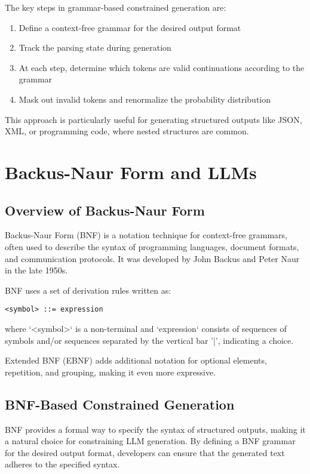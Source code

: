 \documentclass{article}
\begin{document}
The key steps in grammar-based constrained generation are:
\begin{enumerate}
    \item Define a context-free grammar for the desired output format
    \item Track the parsing state during generation
    \item At each step, determine which tokens are valid continuations according to the grammar
    \item Mask out invalid tokens and renormalize the probability distribution
\end{enumerate}

This approach is particularly useful for generating structured outputs like JSON, XML, or programming code, where nested structures are common.

\section{Backus-Naur Form and LLMs}

\subsection{Overview of Backus-Naur Form}

Backus-Naur Form (BNF) is a notation technique for context-free grammars, often used to describe the syntax of programming languages, document formats, and communication protocols. It was developed by John Backus and Peter Naur in the late 1950s.

BNF uses a set of derivation rules written as:
\begin{verbatim}
<symbol> ::= expression
\end{verbatim}

where `<symbol>` is a non-terminal and `expression` consists of sequences of symbols and/or sequences separated by the vertical bar '|', indicating a choice.

Extended BNF (EBNF) adds additional notation for optional elements, repetition, and grouping, making it even more expressive.

\subsection{BNF-Based Constrained Generation}

BNF provides a formal way to specify the syntax of structured outputs, making it a natural choice for constraining LLM generation. By defining a BNF grammar for the desired output format, developers can ensure that the generated text adheres to the specified syntax.
\end{document}
